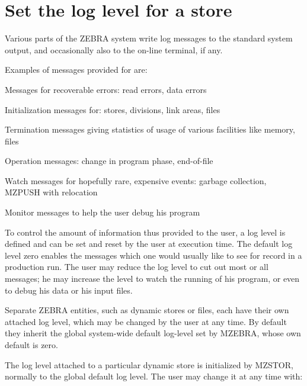 \section{Set the log level for a store}
\par Various parts of the ZEBRA system write log messages
to the standard system output,
and occasionally also to the on-line terminal, if any.
\par Examples of messages provided for are:
\begin{UL}
\item Messages for recoverable errors: read errors, data errors
\item Initialization messages for: stores, divisions, link areas, files
\item Termination messages giving statistics of usage of
various facilities like memory, files
\item Operation messages: change in program phase, end-of-file
\item Watch messages for hopefully rare, expensive events:
garbage collection, MZPUSH with relocation
\item Monitor messages to help the user debug his program
\end{UL}
\par To control the amount of information thus provided to the user,
a log level is defined and can be set and reset by the user
at execution time.
The default log level zero enables the messages which one would
usually like to see for record in a production run.
The user may reduce the log level to cut out most or all messages;
he may increase the level to watch the running of his program,
or even to debug his data or his input files.
\par Separate ZEBRA entities, such as dynamic stores or files,
each have their own attached log level,
which may be changed by the user at any time.
By default they inherit the global system-wide default log-level
set by MZEBRA, whose own default is zero.
\par The log level attached to a particular dynamic store is initialized
by MZSTOR, normally to the global default log level.
The user may change it at any time with:
\Idesc
